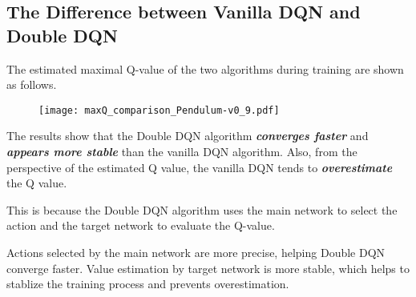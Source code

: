 \documentclass{article}
\begin{document}
\subsection{The Difference between Vanilla DQN and Double DQN}

\hspace{1.2em}

The estimated maximal Q-value of the two algorithms during training are shown as follows.

\vspace{-1em}
\begin{figure}[htbp]
    \centering
    \texttt{[image: maxQ\_comparison\_Pendulum-v0\_9.pdf]}
\end{figure}

The results show that the Double DQN algorithm \textbf{\emph{converges faster}} and \textbf{\emph{appears more stable}} than the vanilla DQN algorithm. Also, from the perspective of the estimated Q value, the vanilla DQN tends to \textbf{\emph{overestimate}} the Q value.


This is because the Double DQN algorithm uses the main network to select the action and the target network to evaluate the Q-value. 

Actions selected by the main network are more precise, helping Double DQN converge faster. Value estimation by target network is more stable, which helps to stablize the training process and prevents overestimation.
\end{document}
